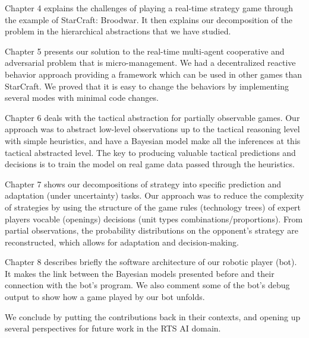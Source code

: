 Chapter 4 explains the challenges of playing a real-time strategy game through the example of StarCraft: Broodwar. It then explains our decomposition of the problem in the hierarchical abstractions that we have studied.

Chapter 5 presents our solution to the real-time multi-agent cooperative and adversarial problem that is micro-management. We had a decentralized reactive behavior approach providing a framework which can be used in other games than StarCraft. We proved that it is easy to change the behaviors by implementing several modes with minimal code changes.

Chapter 6 deals with the tactical abstraction for partially observable games. Our approach was to abstract low-level observations up to the tactical reasoning level with simple heuristics, and have a Bayesian model make all the inferences at this tactical abstracted level. The key to producing valuable tactical predictions and decisions is to train the model on real game data passed through the heuristics.

Chapter 7 shows our decompositions of strategy into specific prediction and adaptation (under uncertainty) tasks. Our approach was to reduce the complexity of strategies by using the structure of the game rules (technology trees) of expert players vocable (openings) decisions (unit types combinations/proportions). From partial observations, the probability distributions on the opponent's strategy are reconstructed, which allows for adaptation and decision-making.

Chapter 8 describes briefly the software architecture of our robotic player (bot). It makes the link between the Bayesian models presented before and their connection with the bot's program. We also comment some of the bot's debug output to show how a game played by our bot unfolds.

We conclude by putting the contributions back in their contexts, and opening up several perspectives for future work in the RTS AI domain.



